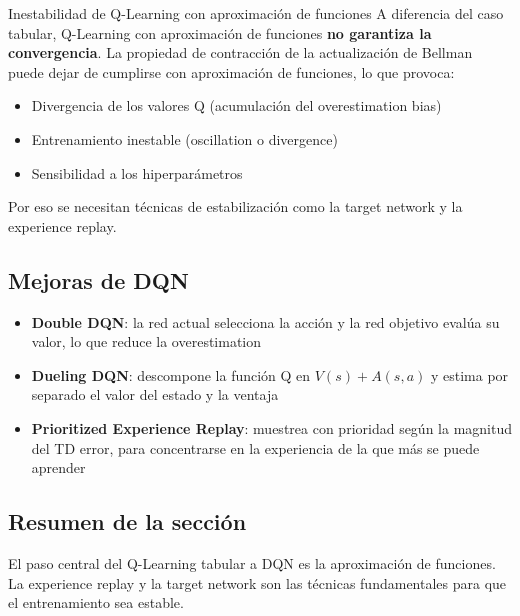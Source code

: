 \begin{warningbox}{Inestabilidad de Q-Learning con aproximación de funciones}
A diferencia del caso tabular, Q-Learning con aproximación de funciones \textbf{no garantiza la convergencia}. La propiedad de contracción de la actualización de Bellman puede dejar de cumplirse con aproximación de funciones, lo que provoca:
\begin{itemize}
    \item Divergencia de los valores Q (acumulación del overestimation bias)
    \item Entrenamiento inestable (oscillation o divergence)
    \item Sensibilidad a los hiperparámetros
\end{itemize}
Por eso se necesitan técnicas de estabilización como la target network y la experience replay.
\end{warningbox}

\subsection{Mejoras de DQN}

\begin{itemize}
    \item \textbf{Double DQN}: la red actual selecciona la acción y la red objetivo evalúa su valor, lo que reduce la overestimation
    \item \textbf{Dueling DQN}: descompone la función Q en $V(s) + A(s, a)$ y estima por separado el valor del estado y la ventaja
    \item \textbf{Prioritized Experience Replay}: muestrea con prioridad según la magnitud del TD error, para concentrarse en la experiencia de la que más se puede aprender
\end{itemize}

\subsection{Resumen de la sección}

El paso central del Q-Learning tabular a DQN es la aproximación de funciones. La experience replay y la target network son las técnicas fundamentales para que el entrenamiento sea estable.

